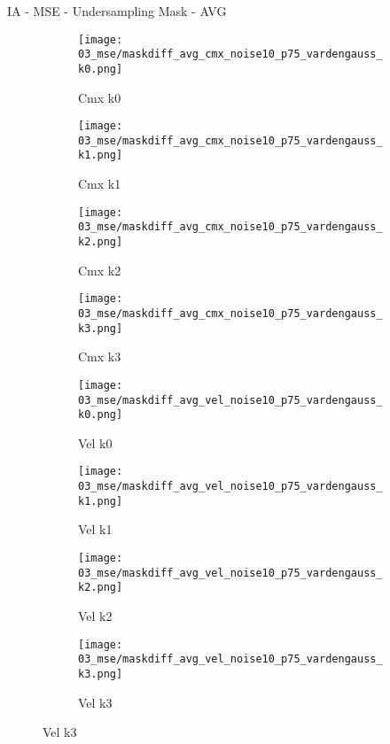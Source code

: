 \documentclass{beamer}
\begin{document}
\begin{frame}{IA - MSE - Undersampling Mask - AVG}{}
\begin{figure}
\begin{subfigure}{0.24\textwidth}
\texttt{[image: 03\_mse/maskdiff\_avg\_cmx\_noise10\_p75\_vardengauss\_k0.png]}
\vspace{-20pt}
\caption*{\tiny Cmx k0}
\end{subfigure}
\begin{subfigure}{0.24\textwidth}
\texttt{[image: 03\_mse/maskdiff\_avg\_cmx\_noise10\_p75\_vardengauss\_k1.png]}
\vspace{-20pt}
\caption*{\tiny Cmx k1}
\end{subfigure}
\begin{subfigure}{0.24\textwidth}
\texttt{[image: 03\_mse/maskdiff\_avg\_cmx\_noise10\_p75\_vardengauss\_k2.png]}
\vspace{-20pt}
\caption*{\tiny Cmx k2}
\end{subfigure}
\begin{subfigure}{0.24\textwidth}
\texttt{[image: 03\_mse/maskdiff\_avg\_cmx\_noise10\_p75\_vardengauss\_k3.png]}
\vspace{-20pt}
\caption*{\tiny Cmx k3}
\end{subfigure}

\begin{subfigure}{0.24\textwidth}
\texttt{[image: 03\_mse/maskdiff\_avg\_vel\_noise10\_p75\_vardengauss\_k0.png]}
\vspace{-20pt}
\caption*{\tiny Vel k0}
\end{subfigure}
\begin{subfigure}{0.24\textwidth}
\texttt{[image: 03\_mse/maskdiff\_avg\_vel\_noise10\_p75\_vardengauss\_k1.png]}
\vspace{-20pt}
\caption*{\tiny Vel k1}
\end{subfigure}
\begin{subfigure}{0.24\textwidth}
\texttt{[image: 03\_mse/maskdiff\_avg\_vel\_noise10\_p75\_vardengauss\_k2.png]}
\vspace{-20pt}
\caption*{\tiny Vel k2}
\end{subfigure}
\begin{subfigure}{0.24\textwidth}
\texttt{[image: 03\_mse/maskdiff\_avg\_vel\_noise10\_p75\_vardengauss\_k3.png]}
\vspace{-20pt}
\caption*{\tiny Vel k3}
\end{subfigure}
\end{figure}
\end{frame}
\end{document}
